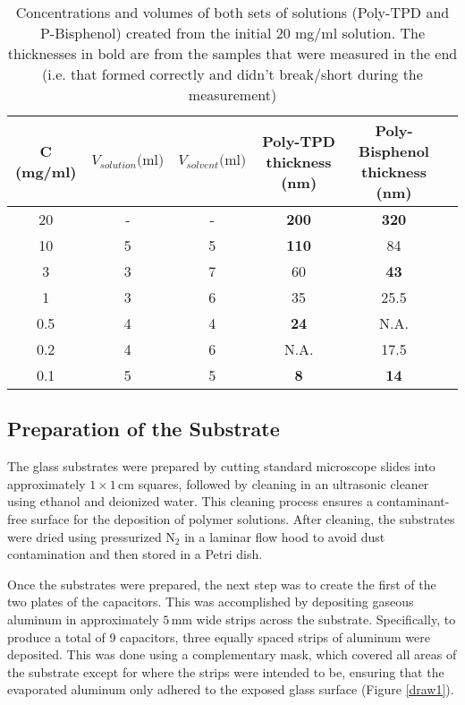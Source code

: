 \begin{table}[]
	\caption{Concentrations and volumes of both sets of solutions (Poly-TPD and P-Bisphenol) created from the initial 20 mg/ml solution. The thicknesses in bold are from the samples that were measured in the end (i.e. that formed correctly and didn't break/short during the measurement)}
\label{tab:solution-concentrations}
\begin{center}
\begin{tabular}{@{}cccccc@{}}
\toprule
C (mg/ml) & $V_{solution}\text{(ml)}$ & $V_{solvent}\text{(ml)}$ & Poly-TPD thickness (nm) & Poly-Bisphenol thickness (nm) \\ \midrule
20       & -  & -  & \textbf{200} & \textbf{320} \\ \midrule
10       & 5  & 5  & \textbf{110} & 84 \\ \midrule
3        & 3  & 7  & 60  & \textbf{43} \\ \midrule
1        & 3  & 6  & 35  & 25.5 \\ \midrule
0.5      & 4  & 4  & \textbf{24}  & N.A. \\ \midrule
0.2      & 4  & 6  & N.A. & 17.5 \\ \midrule
0.1      & 5  & 5  & \textbf{8}   & \textbf{14} \\ \bottomrule
\end{tabular}
\end{center}
\end{table}
\subsection{Preparation of the Substrate}

The glass substrates were prepared by cutting standard microscope slides into approximately $1 \times 1 \, \text{cm}$ squares, followed by cleaning in an ultrasonic cleaner using ethanol and deionized water. This cleaning process ensures a contaminant-free surface for the deposition of polymer solutions. After cleaning, the substrates were dried using pressurized $\text{N}_2$ in a laminar flow hood to avoid dust contamination and then stored in a Petri dish.

Once the substrates were prepared, the next step was to create the first of the two plates of the capacitors. This was accomplished by depositing gaseous aluminum in approximately $5 \, \text{mm}$ wide strips across the substrate. Specifically, to produce a total of 9 capacitors, three equally spaced strips of aluminum were deposited. This was done using a complementary mask, which covered all areas of the substrate except for where the strips were intended to be, ensuring that the evaporated aluminum only adhered to the exposed glass surface (Figure \ref{draw1}).

